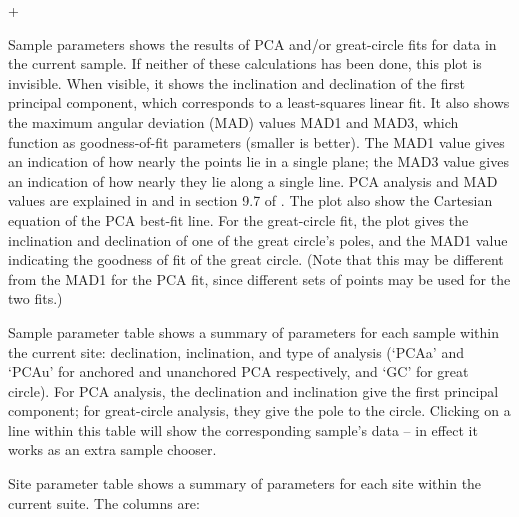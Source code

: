 \documentclass[a4paper,british]{article}
\newcommand{\menuitemlabel}[1]{%
\mbox{\textsf{#1}}\hfil}
\newenvironment{menuitemlist}%
{\begin{list}{}{%
\renewcommand{\makelabel}{\menuitemlabel}%
\setlength{\labelwidth}{35pt}%
\setlength{\leftmargin}%
             {\labelwidth+\labelsep}}}%
{\end{list}}
\newcommand{\caps}[1]{\MakeTextUppercase{#1}} %
\begin{document}
\begin{menuitemlist}
\item[Sample parameters] shows the results of \caps{pca} and/or great-circle
  fits for data in the current sample. If neither of these calculations has
  been done, this plot is invisible. When visible, it shows the inclination
  and declination of the first principal component, which corresponds to a
  least-squares linear fit. It also shows the maximum angular deviation
  (\caps{mad}) values \caps{mad}1 and \caps{mad}3, which function as
  goodness-of-fit parameters (smaller is better). The \caps{mad}1 value gives
  an indication of how nearly the points lie in a single plane; the
  \caps{mad}3 value gives an indication of how nearly they lie along a single
  line. \caps{Pca} analysis and \caps{mad} values are explained in
  \cite{kirschvink1980least} and in section 9.7 of
  \cite{tauxe2010paleomagnetism}. The plot also show the Cartesian equation
  of the \caps{pca} best-fit line. For the great-circle fit, the plot gives the
  inclination and declination of one of the great circle's poles, and the
  \caps{mad}1 value indicating the goodness of fit of the great circle. (Note
  that this may be different from the \caps{mad}1 for the \caps{pca} fit,
  since different sets of points may be used for the two fits.)

\item[Sample parameter table] shows a summary of parameters for each sample
  within the current site: declination, inclination, and type of analysis
  (`\caps{pca}a' and `\caps{pca}u' for anchored and unanchored \caps{pca} respectively, and `GC'
  for great circle). For \caps{pca} analysis, the declination and inclination
  give the first principal component; for great-circle analysis, they
  give the pole to the circle. Clicking on a line within this table
  will show the corresponding sample's data -- in effect it works
  as an extra sample chooser.

\item[Site parameter table] shows a summary of parameters for each site
  within the current suite. The columns are:


\end{menuitemlist}
\end{document}
